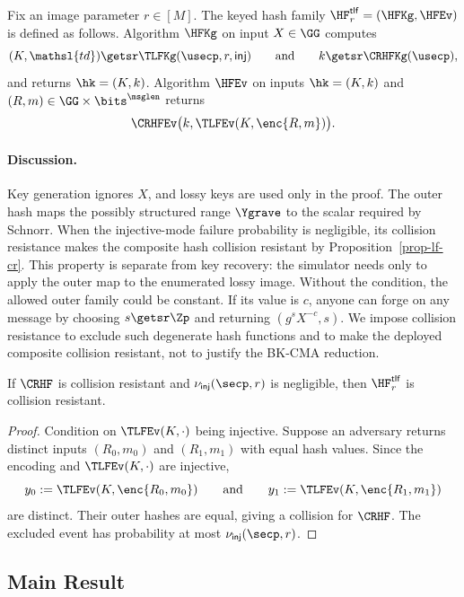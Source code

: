 \begin{construction} \label{constr-lf}
Fix an image parameter $r\in[M]$. The keyed hash family $\HF^{\mathsf{tlf}}_r=(\HFKg,\HFEv)$ is defined as follows. Algorithm $\HFKg$ on input $X\in\GG$ computes
$$
(K,\mathsl{td})\getsr\TLFKg(\usecp,r,\mathsf{inj})
\qquad\text{and}\qquad
k\getsr\CRHFKg(\usecp),
$$
and returns $\hk=(K,k)$. Algorithm $\HFEv$ on inputs $\hk=(K,k)$ and $(R,m)\in\GG\times\bits^{\msglen}$ returns
$$
\CRHFEv\bigl(k,\TLFEv(K,\enc{R,m})\bigr).
$$
\end{construction}

\paragraph*{Discussion.} Key generation ignores $X$, and lossy keys are used only in the proof. The outer hash maps the possibly structured range $\Ygrave$ to the scalar required by Schnorr. When the injective-mode failure probability is negligible, its collision resistance makes the composite hash collision resistant by Proposition~\ref{prop-lf-cr}. This property is separate from key recovery: the simulator needs only to apply the outer map to the enumerated lossy image. Without the condition, the allowed outer family could be constant. If its value is $c$, anyone can forge on any message by choosing $s\getsr\Zp$ and returning $(g^sX^{-c},s)$. We impose collision resistance to exclude such degenerate hash functions and to make the deployed composite collision resistant, not to justify the BK-CMA reduction.

\begin{proposition} \label{prop-lf-cr}
If $\CRHF$ is collision resistant and $\nu_{\mathsf{inj}}(\secp,r)$ is negligible, then $\HF^{\mathsf{tlf}}_r$ is collision resistant.
\end{proposition}

\begin{proof}
Condition on $\TLFEv(K,\cdot)$ being injective. Suppose an adversary returns distinct inputs $(R_0,m_0)$ and $(R_1,m_1)$ with equal hash values. Since the encoding and $\TLFEv(K,\cdot)$ are injective,
$$
y_0:=\TLFEv(K,\enc{R_0,m_0})
\qquad\text{and}\qquad
y_1:=\TLFEv(K,\enc{R_1,m_1})
$$
are distinct. Their outer hashes are equal, giving a collision for $\CRHF$. The excluded event has probability at most $\nu_{\mathsf{inj}}(\secp,r)$.
\end{proof}

\subsection{Main Result} \label{sec-lf-thm}


